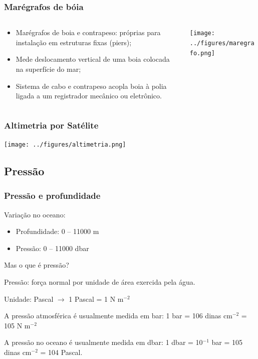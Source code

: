\begin{frame}
\frametitle{Marégrafos de bóia}
    \begin{columns}
        \begin{column}{0.5\textwidth}
        \small{
        \begin{itemize}[<+-| alert@+>]
            \item Marégrafos de boia e contrapeso: próprias para instalação em
                  estruturas fixas (piers);
            \item Mede deslocamento vertical de uma boia colocada na superfície
                  do mar;
            \item Sistema de cabo e contrapeso acopla boia à polia ligada a
                  um registrador mecânico ou eletrônico.
        \end{itemize}
        }
        \end{column}
    \begin{column}{0.5\textwidth}
    \begin{center}
        \texttt{[image: ../figures/maregrafo.png]}
    \end{center}
    \end{column}
    \end{columns}
\end{frame}

\begin{frame}
\frametitle{Altimetria por Satélite}
    \begin{center}
       \texttt{[image: ../figures/altimetria.png]}
    \end{center}
\end{frame}

\subsection{Pressão}
\begin{frame}
\frametitle{Pressão e profundidade}
Variação no oceano:
    \small{
    \begin{itemize}[<+-| alert@+>]
    \item Profundidade: 0 -- 11000 m
    \item Pressão: 0 -- 11000 dbar
    \end{itemize}
    }
    \pause
    Mas o que é pressão?
    \pause
    \begin{block}{}
        Pressão: força normal por unidade de área exercida pela água.

        Unidade: Pascal $\rightarrow$ 1 Pascal = 1 N m$^{-2}$
    \end{block}

    \begin{block}{}
        A pressão atmosférica é usualmente medida em bar:
        1 bar = 106 dinas cm$^{-2}$ = 105 N m$^{-2}$

        A pressão no oceano é usualmente medida em dbar:
        1 dbar = 10$^{-1}$ bar = 105 dinas cm$^{-2}$ = 104 Pascal.
    \end{block}
\end{frame}

